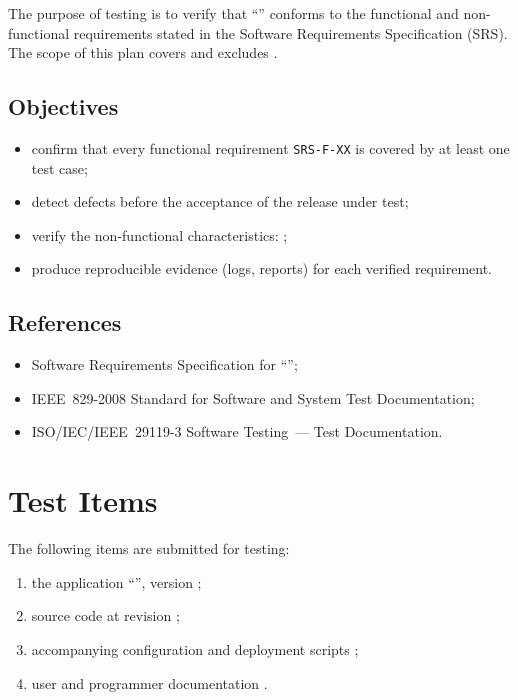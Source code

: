 \documentclass[12pt,a4paper]{extarticle}
\begin{document}
The purpose of testing is to verify that \enquote{\projectname} conforms to the functional and non-functional requirements stated in the Software Requirements Specification (SRS). The scope of this plan covers  and excludes .

\subsection{Objectives}

\begin{itemize}[leftmargin=1.25cm]
    \item confirm that every functional requirement \texttt{SRS-F-XX} is covered by at least one test case;
    \item detect defects before the acceptance of the release under test;
    \item verify the non-functional characteristics: ;
    \item produce reproducible evidence (logs, reports) for each verified requirement.
\end{itemize}

\subsection{References}

\begin{itemize}[leftmargin=1.25cm]
    \item Software Requirements Specification for \enquote{\projectname};
    \item IEEE~829-2008 Standard for Software and System Test Documentation;
    \item ISO/IEC/IEEE~29119-3 Software Testing~--- Test Documentation.
\end{itemize}

\section{Test Items}

The following items are submitted for testing:

\begin{enumerate}[label=\arabic*), leftmargin=1.25cm]
    \item the application \enquote{\hseProjectNameShort}, version ;
    \item source code at revision ;
    \item accompanying configuration and deployment scripts ;
    \item user and programmer documentation .
\end{enumerate}
\end{document}
